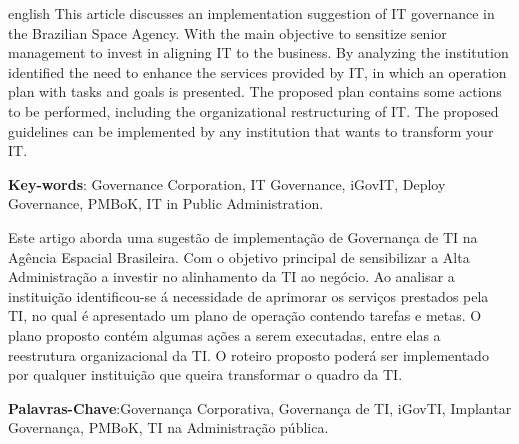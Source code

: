 \documentclass[
	article,			%
	11pt,				%
	oneside,			%
	a4paper,			%
	english,			%
	brazil,				%
	]{abntex2}
\begin{document}
\frenchspacing 


%
%
\maketitle
\renewcommand{\resumoname}{Abstract}
\begin{resumoumacoluna}
 \begin{otherlanguage*}{english}
This article discusses an implementation suggestion of IT governance in the Brazilian Space Agency. With the main objective to sensitize senior management to invest in aligning IT to the business. By analyzing the institution identified the need to enhance the services provided by IT, in which an operation plan with tasks and goals is presented. The proposed plan contains some actions to be performed, including the organizational restructuring of IT. The proposed guidelines can be implemented by any institution that wants to transform your IT.

   \vspace{\onelineskip}
 
   \noindent
   \textbf{Key-words}: Governance Corporation, IT Governance, iGovIT, Deploy Governance, PMBoK, IT in Public Administration.
 \end{otherlanguage*}  
\end{resumoumacoluna}

\renewcommand{\resumoname}{Resumo}
\begin{resumoumacoluna}
  Este artigo aborda uma sugestão de implementação de Governança de TI na Agência Espacial Brasileira. Com o objetivo principal de sensibilizar a Alta Administração a investir no alinhamento da TI ao negócio. Ao analisar a instituição identificou-se á necessidade de aprimorar os serviços prestados pela TI, no qual é apresentado um plano de operação contendo tarefas e metas. O plano proposto contém algumas ações a serem executadas, entre elas a reestrutura organizacional da TI. O roteiro proposto poderá ser implementado por qualquer instituição que queira transformar o quadro da TI.
  
\vspace{\onelineskip}

\noindent \textbf{Palavras-Chave}:Governança Corporativa, Governança de TI, iGovTI, Implantar Governança, PMBoK, TI na Administração pública.
\end{resumoumacoluna}
\end{document}
